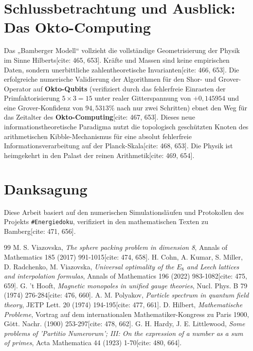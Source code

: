 \documentclass[11pt,a4paper]{article}
\theoremstyle{definition}
\begin{document}
	\section{Schlussbetrachtung und Ausblick: Das Okto-Computing}
	Das „Bamberger Modell“ vollzieht die vollständige Geometrisierung der Physik im Sinne Hilberts[cite: 465, 653]. Kräfte und Massen sind keine empirischen Daten, sondern unerbittliche zahlentheoretische Invarianten[cite: 466, 653]. Die erfolgreiche numerische Validierung der Algorithmen für den Shor- und Grover-Operator auf \textbf{Okto-Qubits} (verifiziert durch das fehlerfreie Einrasten der Primfaktorisierung $5 \times 3 = 15$ unter realer Gitterspannung von $+0{,}145954$ und eine Grover-Konfidenz von $94{,}5313\%$ nach nur zwei Schritten) ebnet den Weg für das Zeitalter des \textbf{Okto-Computing}[cite: 467, 653]. Dieses neue informationstheoretische Paradigma nutzt die topologisch geschützten Knoten des arithmetischen Kibble-Mechanismus für eine absolut fehlerfreie Informationsverarbeitung auf der Planck-Skala[cite: 468, 653]. Die Physik ist heimgekehrt in den Palast der reinen Arithmetik[cite: 469, 654].
	
	\section*{Danksagung}
	Diese Arbeit basiert auf den numerischen Simulationsläufen und Protokollen des Projekts \texttt{\#Energiedoku}, verifiziert in den mathematischen Texten zu Bamberg[cite: 471, 656].
	
	\begin{thebibliography}{99}
		 M. S. Viazovska, \textit{The sphere packing problem in dimension 8}, Annals of Mathematics 185 (2017) 991-1015[cite: 474, 658].
		 H. Cohn, A. Kumar, S. Miller, D. Radchenko, M. Viazovska, \textit{Universal optimality of the $E_8$ and Leech lattices and interpolation formulas}, Annals of Mathematics 196 (2022) 983-1082[cite: 475, 659].
		 G. 't Hooft, \textit{Magnetic monopoles in unified gauge theories}, Nucl. Phys. B 79 (1974) 276-284[cite: 476, 660].
		 A. M. Polyakov, \textit{Particle spectrum in quantum field theory}, JETP Lett. 20 (1974) 194-195[cite: 477, 661].
		 D. Hilbert, \textit{Mathematische Probleme}, Vortrag auf dem internationalen Mathematiker-Kongress zu Paris 1900, Gött. Nachr. (1900) 253-297[cite: 478, 662].
		 G. H. Hardy, J. E. Littlewood, \textit{Some problems of 'Partitio Numerorum'; III: On the expression of a number as a sum of primes}, Acta Mathematica 44 (1923) 1-70[cite: 480, 664].
	\end{thebibliography}
	
\end{document}
